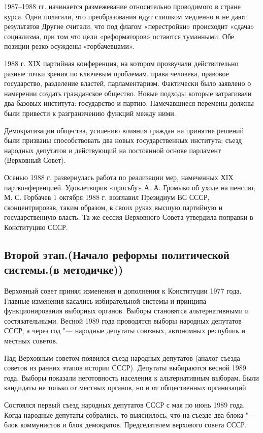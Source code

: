 1987–1988 гг. начинается размежевание относительно проводимого в стране курса. Одни полагали, что преобразования идут слишком медленно и не дают результатов Другие считали, что под флагом «перестройки» происходит «сдача» социализма, при том что цели «реформаторов» остаются туманными. Обе позиции резко осуждены «горбачевцами». 

1988 г. ХIХ партийная конференция, на котором прозвучали действительно разные точки зрения по ключевым проблемам. права человека, правовое государство, разделение властей, парламентаризм. Фактически было заявлено о намерении создать гражданское общество. Новые подходы которые затрагивали два базовых института: государство и партию. Намечавшиеся перемены должны были привести к разграничению функций между ними.

Демократизации общества, усилению влияния граждан на принятие решений были призваны способствовать два новых государственных института: съезд народных депутатов и действующий на постоянной основе парламент (Верховный Совет). 

Осенью 1988 г. развернулась работа по реализации мер, намеченных ХIХ партконференцией. Удовлетворив «просьбу» А. А. Громыко об уходе на пенсию, М. С. Горбачев 1 октября 1988 г. возглавил Президиум ВС СССР, сконцентрировав, таким образом, в своих руках высшую партийную и государственную власть. Та же сессия Верховного Совета утвердила поправки в Конституцию СССР.


\subsection{Второй этап.(Начало реформы политической системы.(в методичке))}

Верховный совет принял изменения и дополнения к Конституции 1977 года. Главные изменения касались избирательной системы и принципа функционирования выборных органов. Выборы становятся альтернативными и состязательными. Весной 1989 года проводятся выборы народных депутатов СССР, а через год "--- народные депутаты союзных, автономных республик и местных советов.

Над Верховным советом появился съезд народных депутатов (аналог съезда советов из ранних этапов истории СССР). Депутаты выбираются весной 1989 года. Выборы показали неготовность населения к альтернативным выборам. Были кандидаты не только от местных органов, но и от общественных организаций.

Состоялся первый съезд народных депутатов СССР с мая по июнь 1989 года. Когда народные депутаты собрались, то выяснилось, что на  съезде два блока "--- блок коммунистов и блок демократов. Председателем верхового совета СССР.

